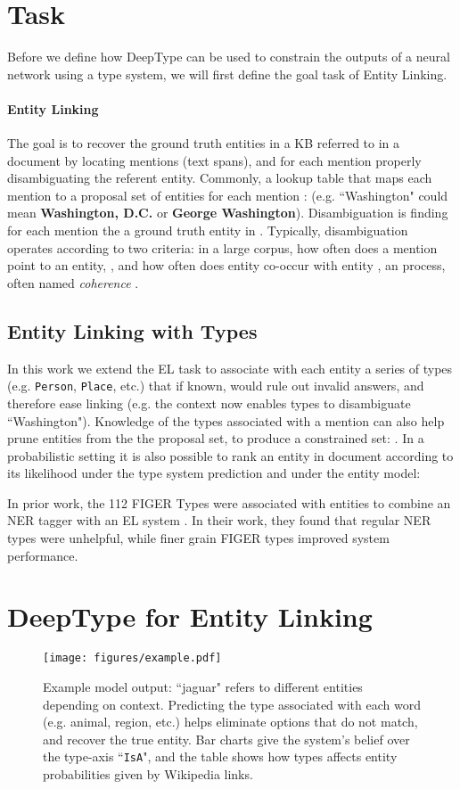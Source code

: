 \documentclass[letterpaper]{article}
\begin{document}
\section{Task}

Before we define how DeepType can be used to constrain the outputs of a neural network using a type system, we will first define the goal task of Entity Linking.
\paragraph{Entity Linking} The goal is to recover the ground truth entities in a KB referred to in a document by locating mentions (text spans), and for each mention properly disambiguating the referent entity. Commonly, a lookup table that maps each mention to a proposal set of entities for each mention :  (e.g. ``Washington" could mean \textbf{Washington, D.C.} or \textbf{George Washington}). Disambiguation is finding for each mention  the a ground truth entity  in . Typically, disambiguation operates according to two criteria: in a large corpus, how often does a mention point to an entity, , and how often does entity  co-occur with entity , an  process, often named {\em coherence} \cite{milne2008learning,tagme,yamada2016joint}.

\subsection{Entity Linking with Types}
In this work we extend the EL task to associate with each entity a series of types (e.g. \texttt{Person}, \texttt{Place}, etc.) that if known, would rule out invalid answers, and therefore ease linking (e.g. the context now enables types to disambiguate ``Washington"). Knowledge of the types  associated with a mention can also help prune entities from the the proposal set, to produce a constrained set: .
In a probabilistic setting it is also possible to rank an entity  in document  according to its likelihood under the type system prediction and under the entity model:

In prior work, the 112 FIGER Types \cite{ling2012fine} were associated with entities to combine an NER tagger with an EL system \cite{ling2015design}. In their work, they found that regular NER types were unhelpful, while finer grain FIGER types improved system performance.

\section{DeepType for Entity Linking}
\begin{figure*}[ht]
    \centering
    \texttt{[image: figures/example.pdf]}
    \caption{Example model output: ``jaguar" refers to different entities depending on context. Predicting the type associated with each word (e.g. animal, region, etc.) helps eliminate options that do not match, and recover the true entity. Bar charts give the system's belief over the type-axis ``\texttt{IsA}", and the table shows how types affects entity probabilities given by Wikipedia links.}
    \label{fig:example}
\end{figure*}
\end{document}
